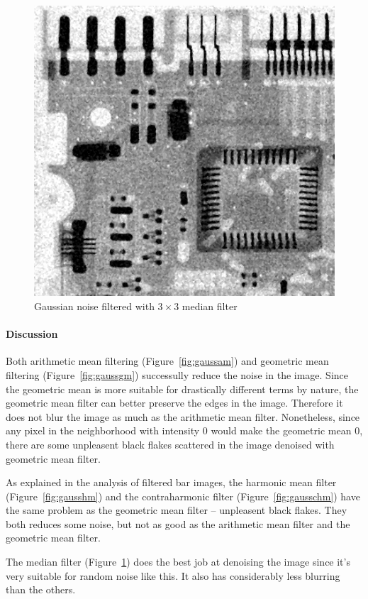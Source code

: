 \documentclass{article}
\begin{document}
\begin{figure}[]
	\centering
	\includegraphics[width=336pt]{../result/task2/gauss/gauss-median.png}
	\caption{Gaussian noise filtered with $3 \times 3$ median filter}
	\label{fig:gaussm}
\end{figure}


\paragraph{Discussion}
Both arithmetic mean filtering (Figure~\ref{fig:gaussam}) and geometric mean filtering (Figure~\ref{fig:gaussgm}) successully reduce the noise in the image. Since the geometric mean is more suitable for drastically different terms by nature, the geometric mean filter can better preserve the edges in the image. Therefore it does not blur the image as much as the arithmetic mean filter. Nonetheless, since any pixel in the neighborhood with intensity $0$ would make the geometric mean $0$, there are some unpleasent black flakes scattered in the image denoised with geometric mean filter.

As explained in the analysis of filtered bar images, the harmonic mean filter (Figure~\ref{fig:gausshm}) and the contraharmonic filter (Figure~\ref{fig:gausschm}) have the same problem as the geometric mean filter -- unpleasent black flakes. They both reduces some noise, but not as good as the arithmetic mean filter and the geometric mean filter.

The median filter (Figure~\ref{fig:gaussm}) does the best job at denoising the image since it's very suitable for random noise like this. It also has considerably less
blurring than the others.
\end{document}
